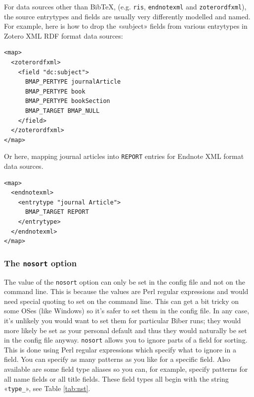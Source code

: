 \documentclass{ltxdockit}
\begin{document}
For data sources other than Bib\TeX, (e.g. \verb+ris+,
\verb+endnotexml+ and \verb+zoterordfxml+), the source entrytypes and
fields are usually very differently modelled and named. For example, here
is how to drop the «subject» fields from various entrytypes in Zotero XML
RDF format data sources:

\lstset{showspaces=false}
\begin{lstlisting}[escapechar=+,mathescape=true]
<map>
  <zoterordfxml>
    <field "dc:subject">
      BMAP_PERTYPE journalArticle
      BMAP_PERTYPE book
      BMAP_PERTYPE bookSection
      BMAP_TARGET BMAP_NULL
    </field>
  </zoterordfxml>
</map>
\end{lstlisting}

\noindent Or here, mapping journal articles into \verb+REPORT+ entries for
Endnote XML format data sources.

\lstset{showspaces=false}
\begin{lstlisting}[escapechar=+,mathescape=true]
<map>
  <endnotexml>
    <entrytype "journal Article">
      BMAP_TARGET REPORT
    </entrytype>
  </endnotexml>
</map>
\end{lstlisting}
\bigskip
\subsubsection{The \texttt{nosort} option}

The value of the \verb+nosort+ option can only be set in the config file
and not on the command line. This is because the values are Perl regular
expressions and would need special quoting to set on the command line. This
can get a bit tricky on some OSes (like Windows) so it's safer to set them
in the config file. In any case, it's unlikely you would want to set them
for particular Biber runs; they would more likely be set as your
personal default and thus they would naturally be set in the config file
anyway. \verb+nosort+ allows you to ignore parts of a field for sorting.
This is done using Perl regular expressions which specify what to
ignore in a field. You can specify as many patterns as you like for a
specific field. Also available are some field type aliases so you can, for
example, specify patterns for all name fields or all title fields. These
field types all begin with the string «\verb+type_+», see Table
\ref{tab:nst}.
\end{document}
